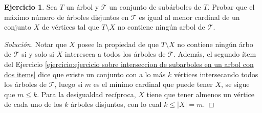 \documentclass[12pt]{report}
\theoremstyle{plain}
\theoremstyle{definition}
\newtheorem{exercise}[theorem]{Ejercicio}
\newenvironment{solution}{\begin{proof}[Solución]}{\end{proof}}
\newcommand{\abs}[1]{\left \vert #1 \right \vert}
\begin{document}
\begin{exercise}
Sea $T$ un árbol y $\mathcal T$ un conjunto de subárboles de $T$. Probar que el máximo número de árboles disjuntos en $\mathcal T$ es igual al menor cardinal de un conjunto $X$ de vértices tal que $T \setminus X$ no contiene ningún arbol de $\mathcal T$.
\end{exercise}
\begin{solution}
Notar que $X$ posee la propiedad de que $T \setminus X$ no contiene ningún árbo de $\mathcal T$ si y solo si $X$ intereseca a todos los árboles de $\mathcal T$. Además, el segundo ítem del Ejercicio \ref{ejercicio:ejercicio sobre interseccion de subarboles en un arbol con dos items} dice que existe un conjunto con a lo más $k$ vértices intersecando todos los árboles de $\mathcal T$, luego si $m$ es el mínimo cardinal que puede tener $X$, se sigue que $m \leq k$. Para la desigualdad recíproca, $X$ tiene que tener almenos un vértice de cada uno de los $k$ árboles disjuntos, con lo cual $k \leq \abs X = m$.
\end{solution}
\end{document}
